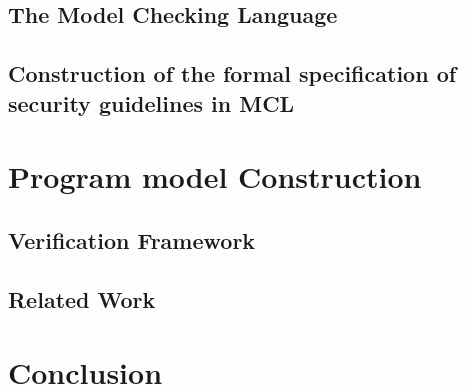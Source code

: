\documentclass[10pt]{article}
\begin{document}
\subsection {The Model Checking Language}
\subsection {Construction of the formal specification of security guidelines in MCL}
\section{Program model Construction}
\subsection {Verification Framework}
\subsection {Related Work}
\section{Conclusion}
\end{document}
